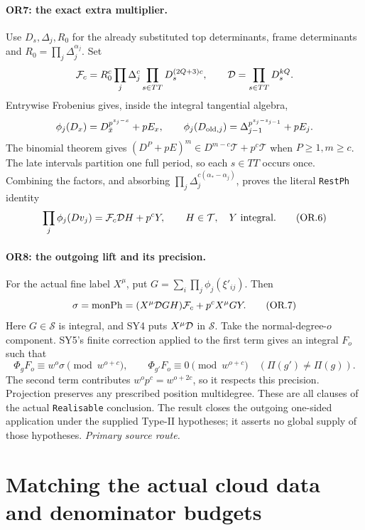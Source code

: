 \documentclass[11pt,a4paper]{article}
\numberwithin{equation}{section}
\theoremstyle{remark}\newtheorem{remark}[theorem]{Remark}
\begin{document}
\paragraph{OR7: the exact extra multiplier.}
Use $D_s,\Delta_j,R_0$ for the already substituted top determinants,
frame determinants and $R_0=\prod_j\Delta_j^{\alpha_j}$.
Set
\[
 {\cal F}_c=R_0^c\prod_j\Delta_j^c\prod_{s\in TT}D_s^{(2Q+3)c},
 \qquad {\cal D}=\prod_{s\in TT}D_s^{kQ}.
\]
Entrywise Frobenius gives, inside the integral tangential algebra,
\[
 \phi_j(D_x)=D_{\bar x}^{p^{z_j-x}}+pE_x,\qquad
 \phi_j(D_{{\rm old},j})=\Delta_{j-1}^{p^{z_j-z_{j-1}}}+pE_j.
\]
The binomial theorem gives
$(D^P+pE)^m\in D^{m-c}\mathcal T+p^c\mathcal T$ when $P\ge1,m\ge c$.
The late intervals partition one full period, so each $s\in TT$ occurs
once. Combining the factors, and absorbing
$\prod_j\Delta_j^{c(\alpha_*-\alpha_j)}$, proves the literal
\texttt{RestPh} identity
\[
                    \prod_j\phi_j(Dv_j)={\cal F}_c{\cal D}H+p^cY,
 \qquad H\in\mathcal T,\quad Y\text{ integral}.             \tag{OR.6}
\]

\paragraph{OR8: the outgoing lift and its precision.}
For the actual fine label $X^\mu$, put
$G=\sum_i\prod_j\phi_j(\xi'_{ij})$. Then
\[
 \sigma=\operatorname{monPh}
       =(X^\mu{\cal D}GH){\cal F}_c+p^cX^\mu GY.            \tag{OR.7}
\]
Here $G\in\mathcal S$ is integral, and SY4 puts
$X^\mu{\cal D}$ in $\mathcal S$. Take the normal-degree-$o$ component.
SY5's finite correction applied to the first term gives an integral
$F_o$ such that
\[
 \Phi_gF_o\equiv w^o\sigma\pmod{w^{o+c}},\qquad
 \Phi_{g'}F_o\equiv0\pmod{w^{o+c}}
 \quad(\Pi(g')\ne\Pi(g)).                                 \tag{OR.8}
\]
The second term contributes $w^op^c=w^{o+2c}$, so it respects this
precision. Projection preserves any prescribed position multidegree.
These are all clauses of the actual \texttt{Realisable} conclusion.
The result closes the outgoing one-sided application under the supplied
Type-II hypotheses; it asserts no global supply of those hypotheses.
\noindent\textit{Primary source route.}\cite{outgoing-actual}


\section{Matching the actual cloud data and denominator budgets}
\label{sec:cloud-parameters}
\end{document}
